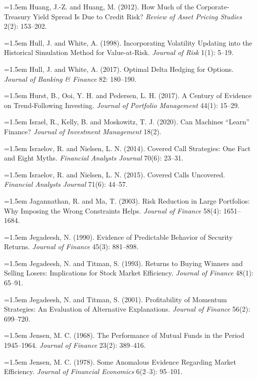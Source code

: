 \hangindent=1.5em Huang, J.-Z. and Huang, M. (2012). How Much of the Corporate-Treasury Yield Spread Is Due to Credit Risk? \emph{Review of Asset Pricing Studies} 2(2): 153--202.

\hangindent=1.5em Hull, J. and White, A. (1998). Incorporating Volatility Updating into the Historical Simulation Method for Value-at-Risk. \emph{Journal of Risk} 1(1): 5--19.

\hangindent=1.5em Hull, J. and White, A. (2017). Optimal Delta Hedging for Options. \emph{Journal of Banking \& Finance} 82: 180--190.

\hangindent=1.5em Hurst, B., Ooi, Y. H. and Pedersen, L. H. (2017). A Century of Evidence on Trend-Following Investing. \emph{Journal of Portfolio Management} 44(1): 15--29.

\hangindent=1.5em Israel, R., Kelly, B. and Moskowitz, T. J. (2020). Can Machines ``Learn'' Finance? \emph{Journal of Investment Management} 18(2).

\hangindent=1.5em Israelov, R. and Nielsen, L. N. (2014). Covered Call Strategies: One Fact and Eight Myths. \emph{Financial Analysts Journal} 70(6): 23--31.

\hangindent=1.5em Israelov, R. and Nielsen, L. N. (2015). Covered Calls Uncovered. \emph{Financial Analysts Journal} 71(6): 44--57.

\hangindent=1.5em Jagannathan, R. and Ma, T. (2003). Risk Reduction in Large Portfolios: Why Imposing the Wrong Constraints Helps. \emph{Journal of Finance} 58(4): 1651--1684.

\hangindent=1.5em Jegadeesh, N. (1990). Evidence of Predictable Behavior of Security Returns. \emph{Journal of Finance} 45(3): 881--898.

\hangindent=1.5em Jegadeesh, N. and Titman, S. (1993). Returns to Buying Winners and Selling Losers: Implications for Stock Market Efficiency. \emph{Journal of Finance} 48(1): 65--91.

\hangindent=1.5em Jegadeesh, N. and Titman, S. (2001). Profitability of Momentum Strategies: An Evaluation of Alternative Explanations. \emph{Journal of Finance} 56(2): 699--720.

\hangindent=1.5em Jensen, M. C. (1968). The Performance of Mutual Funds in the Period 1945--1964. \emph{Journal of Finance} 23(2): 389--416.

\hangindent=1.5em Jensen, M. C. (1978). Some Anomalous Evidence Regarding Market Efficiency. \emph{Journal of Financial Economics} 6(2--3): 95--101.

